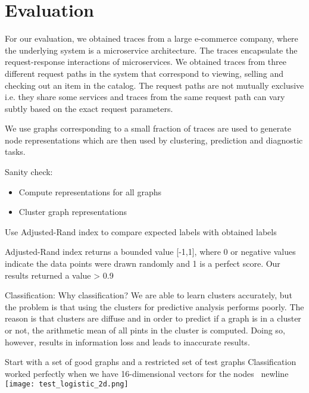 \section{Evaluation}

For our evaluation, we obtained traces from a large e-commerce company, where the underlying system is a microservice architecture. The traces encapsulate the request-response interactions of microservices. We obtained traces from three different request paths in the system that correspond to viewing, selling and checking out an item in the catalog. The request paths are not mutually exclusive i.e. they share some services and traces from the same request path can vary subtly based on the exact request parameters.

We use graphs corresponding to a small fraction of traces are used to generate node representations which are then used by clustering, prediction and diagnostic tasks. 

Sanity check: 
\begin{itemize}
\item Compute representations for all graphs
\item Cluster graph representations
\end{itemize}
Use Adjusted-Rand index to compare expected labels with obtained labels

Adjusted-Rand index returns a bounded value [-1,1], where 0 or negative values indicate the data points were drawn randomly and 1 is a perfect score. Our results returned a value > 0.9

Classification:
Why classification? 
We are able to learn clusters accurately, but the problem is that using the clusters for predictive analysis performs poorly. The reason is that clusters are diffuse and in order to predict if a graph is in a cluster or not, the arithmetic mean of all pints in the cluster is computed. Doing so, however, results in information loss and leads to inaccurate results.

Start with a set of good graphs and a restricted set of test graphs
Classification worked perfectly when we have 16-dimensional vectors for the nodes \ newline
\texttt{[image: test\_logistic\_2d.png]} \newline

